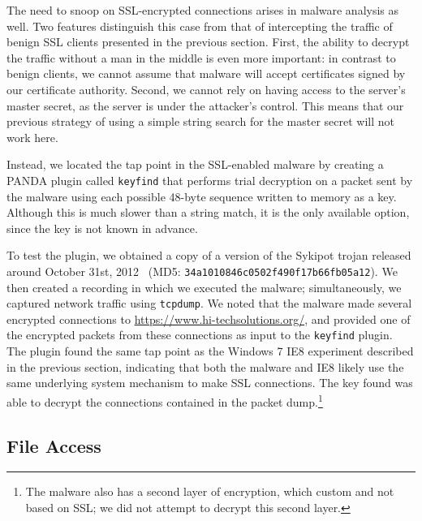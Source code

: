The need to snoop on SSL-encrypted connections arises in malware
analysis as well. Two features distinguish this case from that of
intercepting the traffic of benign SSL clients presented in the previous
section. First, the ability to decrypt the traffic without a man in the
middle is even more important: in contrast to benign clients, we cannot
assume that malware will accept certificates signed by our certificate
authority. Second, we cannot rely on having access to the server's
master secret, as the server is under the attacker's control. This means
that our previous strategy of using a simple string search for the
master secret will not work here.

Instead, we located the tap point in the SSL-enabled malware by creating
a PANDA plugin called \texttt{keyfind} that performs trial decryption on
a packet sent by the malware using each possible 48-byte sequence
written to memory as a key.  Although this is much slower than a string
match, it is the only available option, since the key is not known in
advance.

To test the plugin, we obtained a copy of a version of the Sykipot
trojan released around October 31st, 2012~\cite{sandymal} (MD5:
\texttt{34a1010846c0502f490f17b66fb05a12}). We then created a recording
in which we executed the malware; simultaneously, we captured network
traffic using \texttt{tcpdump}. We noted that the malware made several
encrypted connections to \url{https://www.hi-techsolutions.org/}, and
provided one of the encrypted packets from these connections as input to
the \texttt{keyfind} plugin. The plugin found the same tap point as the
Windows 7 IE8 experiment described in the previous section, indicating
that both the malware and IE8 likely use the same underlying system
mechanism to make SSL connections. The key found was able to decrypt the
connections contained in the packet dump.\footnote{The malware also has
a second layer of encryption, which custom and not based on SSL; we did
not attempt to decrypt this second layer.}

\subsection{File Access}
\label{sec:eval:subsec:file}

